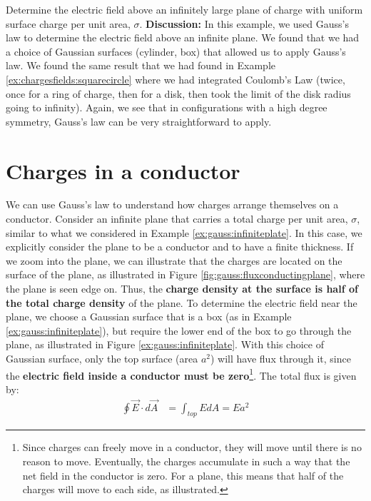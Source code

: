 \begin{example}{Determine the electric field above an infinitely large plane of charge with uniform surface charge per unit area, $\sigma$.}
\textbf{Discussion: }In this example, we used Gauss's law to determine the electric field above an infinite plane. We found that we had a choice of Gaussian surfaces (cylinder, box) that allowed us to apply Gauss's law. We found the same result that we had found in Example \ref{ex:chargesfields:squarecircle} where we had integrated Coulomb's Law (twice, once for a ring of charge, then for a disk, then took the limit of the disk radius going to infinity). Again, we see that in configurations with a high degree symmetry, Gauss's law can be very straightforward to apply.
\end{example}


\section{Charges in a conductor}
\label{sec:gauss:conductors}
We can use Gauss's law to understand how charges arrange themselves on a conductor. Consider an infinite plane that carries a total charge per unit area, $\sigma$, similar to what we considered in Example \ref{ex:gauss:infiniteplate}. In this case, we explicitly consider the plane to be a conductor and to have a finite thickness. If we zoom into the plane, we can illustrate that the charges are located on the surface of the plane, as illustrated in Figure \ref{fig:gauss:fluxconductingplane}, where the plane is seen edge on. Thus, the \textbf{charge density at the surface is half of the total charge density} of the plane.
To determine the electric field near the plane, we choose a Gaussian surface that is a box (as in Example \ref{ex:gauss:infiniteplate}), but require the lower end of the box to go through the plane, as illustrated in Figure \ref{ex:gauss:infiniteplate}. With this choice of Gaussian surface, only the top surface (area $a^2$) will have flux through it, since the \textbf{electric field inside a conductor must be zero}\footnote{Since charges can freely move in a conductor, they will move until there is no reason to move. Eventually, the charges accumulate in such a way that the net field in the conductor is zero. For a plane, this means that half of the charges will move to each side, as illustrated.}. The total flux is given by:
\begin{align*}
\oint \vec E\cdot d\vec A&= \int_{top} EdA=Ea^2
\end{align*}
